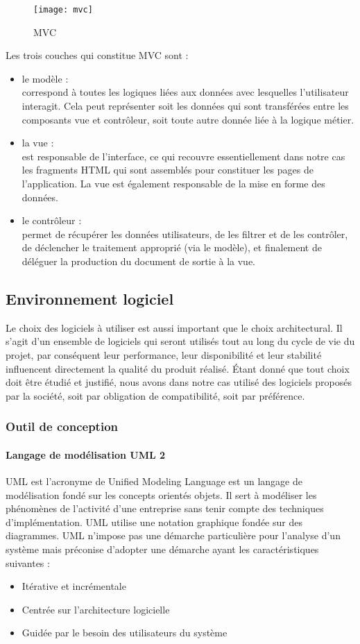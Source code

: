 \begin{figure}[htpb]
\centering
    \texttt{[image: mvc]}
    \caption{MVC}
    \label{fig:mvc}
\end{figure}
Les trois couches qui constitue MVC sont :
\begin{itemize}
    \item le modèle : \\
    correspond à toutes les logiques liées aux données avec lesquelles l'utilisateur interagit. Cela peut représenter soit les données qui sont transférées entre les composants vue et contrôleur, soit toute autre donnée liée à la logique métier.
    \item la vue : \\
    est responsable de l'interface, ce qui recouvre essentiellement dans notre cas les fragments HTML qui sont assemblés pour constituer les pages de l'application. La vue est également responsable de la mise en forme des données.
    \item le contrôleur : \\
    permet de récupérer les données utilisateurs, de les filtrer et de les contrôler, de déclencher le traitement approprié (via le modèle), et finalement de déléguer la production du document de sortie à la vue.
\end{itemize}

\subsection{Environnement logiciel}
Le choix des logiciels à utiliser est aussi important que le choix architectural. Il s’agit d’un ensemble de logiciels qui seront utilisés tout au long du cycle de vie du projet, par conséquent
leur performance, leur disponibilité et leur stabilité influencent directement la qualité du produit réalisé. Étant donné que tout choix doit être étudié et justifié, nous avons dans notre cas utilisé
des logiciels proposés par la société, soit par obligation de compatibilité, soit par préférence.
\subsubsection{Outil de conception}
\paragraph{Langage de modélisation UML 2  \\}
UML est l'acronyme de Unified Modeling Language est un langage de modélisation fondé sur les concepts orientés objets. Il sert à modéliser les phénomènes de l'activité d'une entreprise sans tenir compte des techniques d'implémentation. UML utilise une
notation graphique fondée sur des diagrammes. UML n'impose pas une démarche particulière pour l'analyse d'un système mais préconise d'adopter une démarche ayant les caractéristiques suivantes :
\begin{itemize}
    \item Itérative et incrémentale
    \item Centrée sur l'architecture logicielle
    \item Guidée par le besoin des utilisateurs du système  
\end{itemize}

